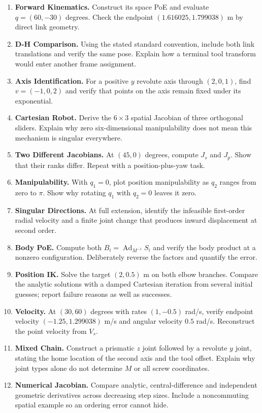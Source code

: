 \begin{enumerate}
 \item \textbf{Forward Kinematics.} Construct its space PoE and evaluate $q=(60,-30)$ degrees. Check the endpoint $(1.616025,1.799038)$ m by direct link geometry.
 \item \textbf{D-H Comparison.} Using the stated standard convention, include both link translations and verify the same pose. Explain how a terminal tool transform would enter another frame assignment.
 \item \textbf{Axis Identification.} For a positive $y$ revolute axis through $(2,0,1)$, find $v=(-1,0,2)$ and verify that points on the axis remain fixed under its exponential.
 \item \textbf{Cartesian Robot.} Derive the $6\times3$ spatial Jacobian of three orthogonal sliders. Explain why zero six-dimensional manipulability does not mean this mechanism is singular everywhere.
 \item \textbf{Two Different Jacobians.} At $(45,0)$ degrees, compute $J_s$ and $J_p$. Show that their ranks differ. Repeat with a position-plus-yaw task.
 \item \textbf{Manipulability.} With $q_1=0$, plot position manipulability as $q_2$ ranges from zero to $\pi$. Show why rotating $q_1$ with $q_2=0$ leaves it zero.
 \item \textbf{Singular Directions.} At full extension, identify the infeasible first-order radial velocity and a finite joint change that produces inward displacement at second order.
 \item \textbf{Body PoE.} Compute both $B_i=\operatorname{Ad}_{M^{-1}}S_i$ and verify the body product at a nonzero configuration. Deliberately reverse the factors and quantify the error.
 \item \textbf{Position IK.} Solve the target $(2,0.5)$ m on both elbow branches. Compare the analytic solutions with a damped Cartesian iteration from several initial guesses; report failure reasons as well as successes.
 \item \textbf{Velocity.} At $(30,60)$ degrees with rates $(1,-0.5)$ rad/s, verify endpoint velocity $(-1.25,1.299038)$ m/s and angular velocity $0.5$ rad/s. Reconstruct the point velocity from $V_s$.
 \item \textbf{Mixed Chain.} Construct a prismatic $z$ joint followed by a revolute $y$ joint, stating the home location of the second axis and the tool offset. Explain why joint types alone do not determine $M$ or all screw coordinates.
 \item \textbf{Numerical Jacobian.} Compare analytic, central-difference and independent geometric derivatives across decreasing step sizes. Include a noncommuting spatial example so an ordering error cannot hide.

\end{enumerate}
